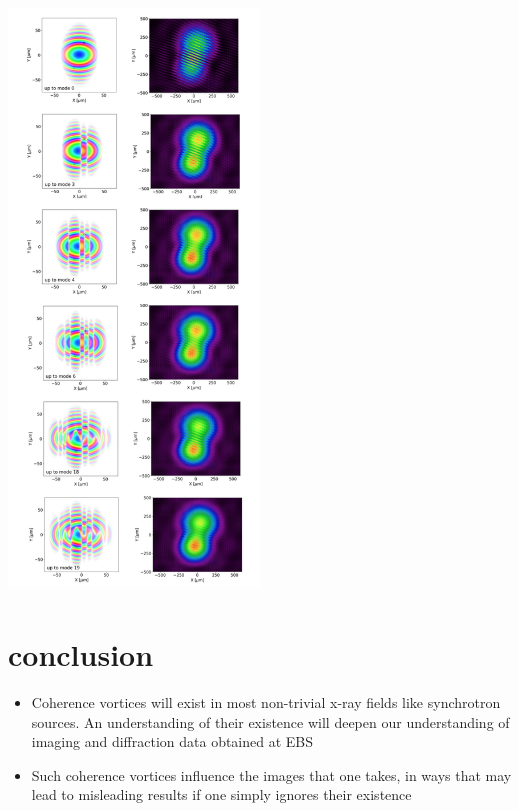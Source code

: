 \documentclass[a4paper,10pt]{article}
\begin{document}
\begin{center}
 \includegraphics[width=0.5\textwidth]{Figures/interference-low-resolution.png}
 \end{center}

\section{conclusion}

\begin{itemize}
\item Coherence vortices will exist in most non-trivial x-ray fields like synchrotron sources. An understanding of their existence will deepen our understanding of imaging and diffraction data obtained at EBS
\item Such coherence vortices influence the images that one takes, in ways that may lead to misleading results if one simply ignores their existence
\end{itemize}
 
 
 
 
 
 
 
 
 


\end{document}
